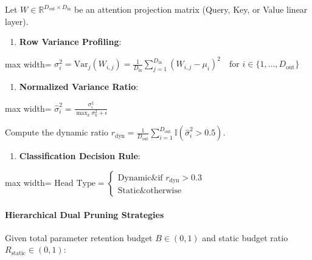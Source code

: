 Let $W \in \mathbb{R}^{D_{\text{out}} \times D_{\text{in}}}$ be an attention projection matrix (Query, Key, or Value linear layer).

\begin{enumerate}
\item \textbf{Row Variance Profiling}:
\end{enumerate}
\begin{center}
\begin{adjustbox}{max width=\columnwidth}
$\displaystyle
\sigma_i^2 = \text{Var}_j(W_{i, j}) = \frac{1}{D_{\text{in}}} \sum_{j=1}^{D_{\text{in}}} \left( W_{i, j} - \mu_i \right)^2 \quad \text{for } i \in \{1, \dots, D_{\text{out}}\}
$
\end{adjustbox}
\end{center}

\begin{enumerate}
\item \textbf{Normalized Variance Ratio}:
\end{enumerate}
\begin{center}
\begin{adjustbox}{max width=\columnwidth}
$\displaystyle
\widehat{\sigma}_i^2 = \frac{\sigma_i^2}{\max_k \sigma_k^2 + \epsilon}
$
\end{adjustbox}
\end{center}
Compute the dynamic ratio $r_{\text{dyn}} = \frac{1}{D_{\text{out}}} \sum_{i=1}^{D_{\text{out}}} \mathbb{I}(\widehat{\sigma}_i^2 > 0.5)$.

\begin{enumerate}
\item \textbf{Classification Decision Rule}:
\end{enumerate}
\begin{center}
\begin{adjustbox}{max width=\columnwidth}
$\displaystyle
\text{Head Type} = \begin{cases} \text{Dynamic} \& \text{if } r_{\text{dyn}} > 0.3 \\ \text{Static} \& \text{otherwise} \end{cases}
$
\end{adjustbox}
\end{center}

\paragraph{Hierarchical Dual Pruning Strategies}

Given total parameter retention budget $B \in (0, 1)$ and static budget ratio $R_{\text{static}} \in (0, 1)$:

